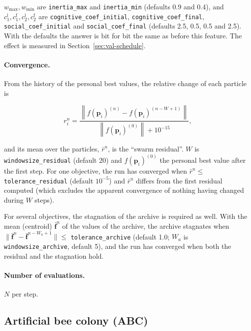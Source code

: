 \documentclass[11pt,a4paper]{article}
\begin{document}
\begin{sloppypar}
$w_{\max}, w_{\min}$ are \texttt{inertia\_max} and \texttt{inertia\_min} (defaults 0.9 and 0.4), and $c_1^{\mathrm{i}}, c_1^{\mathrm{f}}, c_2^{\mathrm{i}}, c_2^{\mathrm{f}}$ are \texttt{cognitive\_coef\_initial}, \texttt{cognitive\_coef\_final}, \texttt{social\_coef\_initial} and \texttt{social\_coef\_final} (defaults 2.5, 0.5, 0.5 and 2.5). With the defaults the answer is bit for bit the same as before this feature. The effect is measured in Section~\ref{sec:val-schedule}.
\end{sloppypar}

\paragraph{Convergence.} From the history of the personal best values, the relative change of each particle is

\begin{equation}
  r_i^n = \frac{\left\| f(\mathbf{p}_i)^{(n)} - f(\mathbf{p}_i)^{(n-W+1)} \right\|}{\left\| f(\mathbf{p}_i)^{(0)} \right\| + 10^{-15}},
\end{equation}

and its mean over the particles, $\bar r^n$, is the ``swarm residual''. $W$ is \texttt{windowsize\_residual} (default 20) and $f(\mathbf{p}_i)^{(0)}$ the personal best value after the first step. For one objective, the run has converged when $\bar r^n \le$ \texttt{tolerance\_residual} (default $10^{-5}$) and $\bar r^n$ differs from the first residual computed (which excludes the apparent convergence of nothing having changed during $W$ steps).

For several objectives, the stagnation of the archive is required as well. With the mean (centroid) $\bar{\mathbf{f}}^n$ of the values of the archive, the archive stagnates when $\|\bar{\mathbf{f}}^n - \bar{\mathbf{f}}^{n-W_a+1}\| \le$ \texttt{tolerance\_archive} (default 1.0; $W_a$ is \texttt{windowsize\_archive}, default 5), and the run has converged when both the residual and the stagnation hold.

\paragraph{Number of evaluations.} $N$ per step.

\subsection{Artificial bee colony (ABC)}\label{sec:abc}
\end{document}
